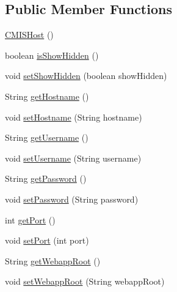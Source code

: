 \subsection*{Public Member Functions}
\begin{DoxyCompactItemize}
\item 
\hyperlink{classcom_1_1zia_1_1freshdocs_1_1preference_1_1_c_m_i_s_host_a7dbe1d9e26e34232092bc70252810669}{C\-M\-I\-S\-Host} ()
\item 
boolean \hyperlink{classcom_1_1zia_1_1freshdocs_1_1preference_1_1_c_m_i_s_host_a0bfbc60937553b7eaa9b761b78081202}{is\-Show\-Hidden} ()
\item 
void \hyperlink{classcom_1_1zia_1_1freshdocs_1_1preference_1_1_c_m_i_s_host_a0fd8b693784bf3e56695209f644277e4}{set\-Show\-Hidden} (boolean show\-Hidden)
\item 
String \hyperlink{classcom_1_1zia_1_1freshdocs_1_1preference_1_1_c_m_i_s_host_ac50e9dabf085a0cb2fffe70bed6ccc49}{get\-Hostname} ()
\item 
void \hyperlink{classcom_1_1zia_1_1freshdocs_1_1preference_1_1_c_m_i_s_host_af8355b10b436f6750aaeefce7335cade}{set\-Hostname} (String hostname)
\item 
String \hyperlink{classcom_1_1zia_1_1freshdocs_1_1preference_1_1_c_m_i_s_host_a8df610a3d56cc7898abdd01d0cf7f803}{get\-Username} ()
\item 
void \hyperlink{classcom_1_1zia_1_1freshdocs_1_1preference_1_1_c_m_i_s_host_ae55970dbae72632866e99219c2fb798b}{set\-Username} (String username)
\item 
String \hyperlink{classcom_1_1zia_1_1freshdocs_1_1preference_1_1_c_m_i_s_host_ac09c9acadf298b7b36859b8a922f945a}{get\-Password} ()
\item 
void \hyperlink{classcom_1_1zia_1_1freshdocs_1_1preference_1_1_c_m_i_s_host_a68b243349ca81ea1776713cf6592ccf3}{set\-Password} (String password)
\item 
int \hyperlink{classcom_1_1zia_1_1freshdocs_1_1preference_1_1_c_m_i_s_host_a969eaecc7456b17b02948faf5a8e4a75}{get\-Port} ()
\item 
void \hyperlink{classcom_1_1zia_1_1freshdocs_1_1preference_1_1_c_m_i_s_host_ac28f835f428dbda0775bee7f556d1333}{set\-Port} (int port)
\item 
String \hyperlink{classcom_1_1zia_1_1freshdocs_1_1preference_1_1_c_m_i_s_host_adc43e284f3b1fd7211cf1cdaa105db9b}{get\-Webapp\-Root} ()
\item 
void \hyperlink{classcom_1_1zia_1_1freshdocs_1_1preference_1_1_c_m_i_s_host_ae581e57b5735347b60147e92806e56d4}{set\-Webapp\-Root} (String webapp\-Root)

\end{DoxyCompactItemize}
